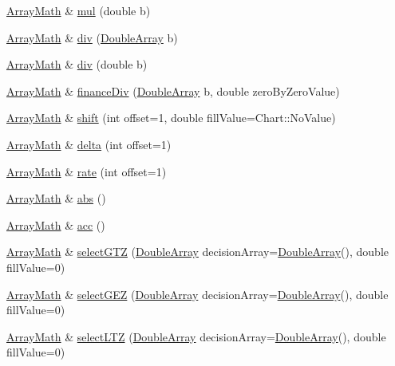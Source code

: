 \begin{DoxyCompactItemize}
\item 
\hyperlink{class_array_math}{Array\+Math} \& \hyperlink{class_array_math_ad44c0c320ef2f9401be5e54d51dc6c73}{mul} (double b)
\item 
\hyperlink{class_array_math}{Array\+Math} \& \hyperlink{class_array_math_a1f2298b0a0338ea48fc3163f6387d11c}{div} (\hyperlink{class_double_array}{Double\+Array} b)
\item 
\hyperlink{class_array_math}{Array\+Math} \& \hyperlink{class_array_math_a8ba4c3f4ec4a35cc310d97e2a647ad4c}{div} (double b)
\item 
\hyperlink{class_array_math}{Array\+Math} \& \hyperlink{class_array_math_a854177572cefc64f20462ad56e74038e}{finance\+Div} (\hyperlink{class_double_array}{Double\+Array} b, double zero\+By\+Zero\+Value)
\item 
\hyperlink{class_array_math}{Array\+Math} \& \hyperlink{class_array_math_a3448f6c81db45f84e63351a00f6d32b3}{shift} (int offset=1, double fill\+Value=Chart\+::\+No\+Value)
\item 
\hyperlink{class_array_math}{Array\+Math} \& \hyperlink{class_array_math_a63280677d4282215230467eadb0ff3ca}{delta} (int offset=1)
\item 
\hyperlink{class_array_math}{Array\+Math} \& \hyperlink{class_array_math_a72a5a6a662b011b093a0aed0aac5df76}{rate} (int offset=1)
\item 
\hyperlink{class_array_math}{Array\+Math} \& \hyperlink{class_array_math_a95ff8e9bce7b34d36cde3186e3f8d886}{abs} ()
\item 
\hyperlink{class_array_math}{Array\+Math} \& \hyperlink{class_array_math_aa4a6b85dd0e0cbbd6055e5381b9f8308}{acc} ()
\item 
\hyperlink{class_array_math}{Array\+Math} \& \hyperlink{class_array_math_aadfd40e8527d58dc41cceec240d1f9b8}{select\+G\+TZ} (\hyperlink{class_double_array}{Double\+Array} decision\+Array=\hyperlink{class_double_array}{Double\+Array}(), double fill\+Value=0)
\item 
\hyperlink{class_array_math}{Array\+Math} \& \hyperlink{class_array_math_adeaae3c00b4d38c471d5956d65861a48}{select\+G\+EZ} (\hyperlink{class_double_array}{Double\+Array} decision\+Array=\hyperlink{class_double_array}{Double\+Array}(), double fill\+Value=0)
\item 
\hyperlink{class_array_math}{Array\+Math} \& \hyperlink{class_array_math_ae10389934cacf3913e69b71c79fe5ae9}{select\+L\+TZ} (\hyperlink{class_double_array}{Double\+Array} decision\+Array=\hyperlink{class_double_array}{Double\+Array}(), double fill\+Value=0)

\end{DoxyCompactItemize}
